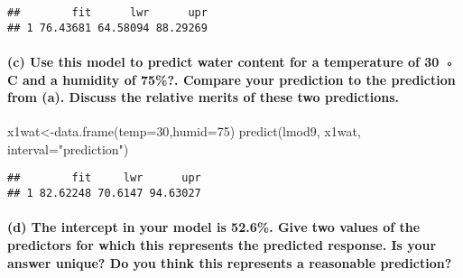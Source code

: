 \documentclass[
]{article}
\newenvironment{Shaded}{\begin{snugshade}}{\end{snugshade}}
\newcommand{\AttributeTok}[1]{\textcolor[rgb]{0.77,0.63,0.00}{#1}}
\newcommand{\DecValTok}[1]{\textcolor[rgb]{0.00,0.00,0.81}{#1}}
\newcommand{\FunctionTok}[1]{\textcolor[rgb]{0.00,0.00,0.00}{#1}}
\newcommand{\NormalTok}[1]{#1}
\newcommand{\OtherTok}[1]{\textcolor[rgb]{0.56,0.35,0.01}{#1}}
\newcommand{\StringTok}[1]{\textcolor[rgb]{0.31,0.60,0.02}{#1}}
\begin{document}
\begin{verbatim}
##        fit      lwr      upr
## 1 76.43681 64.58094 88.29269
\end{verbatim}

\hypertarget{c-use-this-model-to-predict-water-content-for-a-temperature-of-30-c-and-a-humidity-of-75.-compare-your-prediction-to-the-prediction-from-a.-discuss-the-relative-merits-of-these-two-predictions.}{%
\paragraph{(c) Use this model to predict water content for a temperature
of 30 ◦ C and a humidity of 75\%?. Compare your prediction to the
prediction from (a). Discuss the relative merits of these two
predictions.}\label{c-use-this-model-to-predict-water-content-for-a-temperature-of-30-c-and-a-humidity-of-75.-compare-your-prediction-to-the-prediction-from-a.-discuss-the-relative-merits-of-these-two-predictions.}}

\begin{Shaded}
\begin{Highlighting}[]
\NormalTok{x1wat}\OtherTok{\textless{}{-}}\FunctionTok{data.frame}\NormalTok{(}\AttributeTok{temp=}\DecValTok{30}\NormalTok{,}\AttributeTok{humid=}\DecValTok{75}\NormalTok{)}
\FunctionTok{predict}\NormalTok{(lmod9, x1wat, }\AttributeTok{interval=}\StringTok{"prediction"}\NormalTok{)}
\end{Highlighting}
\end{Shaded}

\begin{verbatim}
##        fit     lwr      upr
## 1 82.62248 70.6147 94.63027
\end{verbatim}

\hypertarget{d-the-intercept-in-your-model-is-52.6.-give-two-values-of-the-predictors-for-which-this-represents-the-predicted-response.-is-your-answer-unique-do-you-think-this-represents-a-reasonable-prediction}{%
\paragraph{(d) The intercept in your model is 52.6\%. Give two values of
the predictors for which this represents the predicted response. Is your
answer unique? Do you think this represents a reasonable
prediction?}\label{d-the-intercept-in-your-model-is-52.6.-give-two-values-of-the-predictors-for-which-this-represents-the-predicted-response.-is-your-answer-unique-do-you-think-this-represents-a-reasonable-prediction}}
\end{document}
